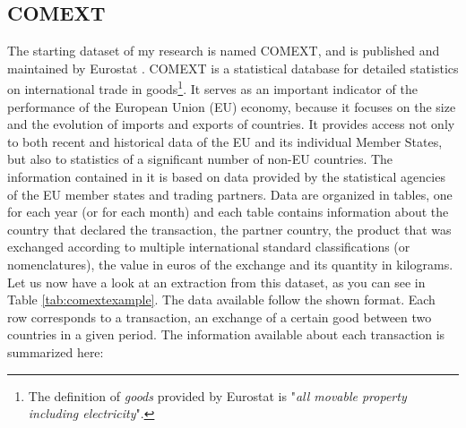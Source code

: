 \subsection{COMEXT}

The starting dataset of my research is named COMEXT, and is published and maintained by Eurostat \cite{eurostat2022comext}. COMEXT is a statistical database for detailed statistics on international trade in goods\footnote{The definition of \textit{goods} provided by Eurostat is "\textit{all movable property including electricity}".}. It serves as an important indicator of the performance of the European Union (EU) economy, because it focuses on the size and the evolution of imports and exports of countries. It provides access not only to both recent and historical data of the EU and its individual Member States, but also to statistics of a significant number of non-EU countries. The information contained in it is based on data provided by the statistical agencies of the EU member states and trading partners.
Data are organized in tables, one for each year (or for each month) and each table contains information about the country that declared the transaction, the partner country, the product that was exchanged according to multiple international standard classifications (or nomenclatures), the value in euros of the exchange and its quantity in kilograms.
Let us now have a look at an extraction from this dataset, as you can see in Table \ref{tab:comextexample}.
The data available follow the shown format. Each row corresponds to a transaction, an exchange of a certain good between two countries in a given period. The information available about each transaction is summarized here:
